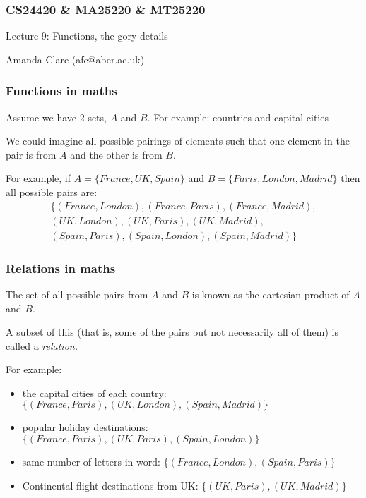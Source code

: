 \documentclass{beamer}
\begin{document}

\begin{frame}
\frametitle{CS24420 \& MA25220 \& MT25220}

\begin{center}
\begin{huge}
Lecture 9: Functions, the gory details
\end{huge}
\bigskip

Amanda Clare (afc@aber.ac.uk)

\end{center}
\end{frame}




\begin{frame}[fragile]
\frametitle{Functions in maths}
Assume we have 2 sets, $A$ and $B$. For example: countries and capital cities
\bigskip

We could imagine all possible pairings of elements such that one
element in the pair is from $A$ and the other is from $B$. 
\bigskip

For example, if
$A = \{France, UK, Spain\}$ and $B = \{Paris, London, Madrid\}$ then all
possible pairs are:
\begin{multline*}
\{ (France, London), (France, Paris), (France, Madrid), \\
(UK, London),
  (UK, Paris), (UK, Madrid), \\
(Spain, Paris), (Spain, London), (Spain,
  Madrid) \}
 \end{multline*}
\end{frame}


\begin{frame}[fragile]
\frametitle{Relations in maths}
The set of all possible pairs from $A$ and $B$ is known as the cartesian product of $A$
and $B$.

A subset of this (that is, some of the pairs but not necessarily all
of them) is called a \em{relation}.

For example: 
\begin{itemize} 
\item the capital cities of each country: $\{(France, Paris), (UK,
  London), (Spain, Madrid) \}$
\item popular holiday destinations: $\{ (France, Paris), (UK, Paris),
  (Spain, London) \}$
\item same number of letters in word: $\{ (France, London), (Spain,
  Paris) \}$
\item Continental flight destinations from UK: $\{ (UK, Paris), (UK, Madrid) \}$
\end{itemize}

\end{frame}
\end{document}

